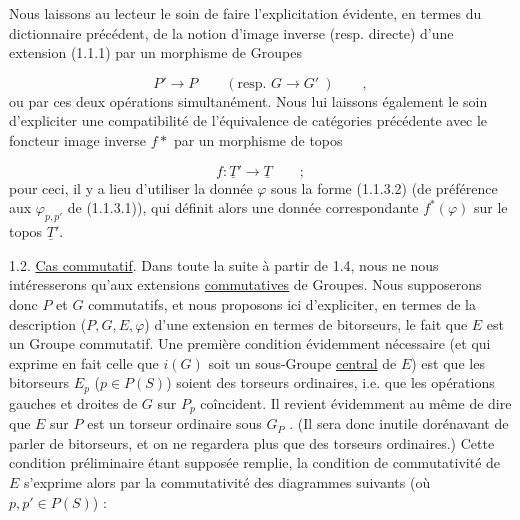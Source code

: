 Nous laissons au lecteur le soin de faire l'explicitation évidente, en termes du dictionnaire précédent, de la notion d'image inverse (resp. directe) d'une extension (1.1.1) par un morphisme de Groupes

\begin{equation*}
P' \longrightarrow P \qquad (\text{resp. } G \longrightarrow G'\ ) \qquad ,
\end{equation*}
ou par ces deux opérations simultanément. Nous lui laissons également le soin d'expliciter une compatibilité de l'équivalence de catégories précédente avec le foncteur image inverse $f*$ par un morphisme de topos

\begin{equation*}
f : \underline{T}' \longrightarrow \underline{T} \qquad ;
\end{equation*}
pour ceci, il y a lieu d'utiliser la donnée $\varphi$ sous la forme (1.1.3.2) (de préférence aux $\varphi_{p,p'}$ de (1.1.3.1)), qui définit alors une donnée correspondante $f^*(\varphi)$ sur le topos $\underline{T}'$.

1.2. \underline{Cas commutatif}. Dans toute la suite à partir de 1.4, nous ne nous intéresserons qu'aux extensions \underline{commutatives} de Groupes. Nous supposerons donc $P$ et $G$ commutatifs, et nous proposons ici d'expliciter, en termes
de la description ($P,G,E,\varphi$) d'une extension en termes de bitorseurs, le fait que $E$ est un Groupe commutatif. Une première condition évidemment nécessaire (et qui exprime en fait celle que $i(G)$ soit un sous-Groupe \underline{central} de $E$) est que les bitorseurs $E_p$ ($p \in P(S)$) soient des torseurs ordinaires, i.e. que les opérations gauches et droites de $G$ sur $P_p$ coîncident. Il revient évidemment au même de dire que $E$ sur $P$ est un torseur ordinaire sous $G_P$ . (Il sera donc inutile dorénavant de parler de bitorseurs, et on ne regardera plus que des torseurs ordinaires.) Cette condition préliminaire étant supposée remplie, la condition de commutativité de $E$ s'exprime alors par la commutativité des diagrammes suivants (où $p,p' \in P(S)$) :

